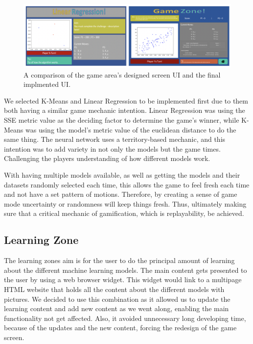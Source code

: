 		\begin{figure}[t]
			\includegraphics[width=15cm]{graphics/game_zone.png}
			\caption{A comparison of the game area's designed screen UI and the final implmented UI.}
			\label{fig:ui_ga}
		\end{figure}
		
		
		We selected K-Means and Linear Regression to be implemented first due to them both having a similar game mechanic intention. Linear Regression was using the SSE metric value as the deciding factor to determine the game's winner, while K-Means was using the model's metric value of the euclidean distance to do the same thing. The neural network uses a territory-based mechanic, and this intention was to add variety in not only the models but the game times. Challenging the players understanding of how different models work.
		
		With having multiple models available, as well as getting the models and their datasets randomly selected each time, this allows the game to feel fresh each time and not have a set pattern of motions. Therefore, by creating a sense of game mode uncertainty or randomness will keep things fresh. Thus, ultimately making sure that a critical mechanic of gamification, which is replayability, be achieved.  
		
	
	\subsection{Learning Zone}
	
	The learning zones aim is for the user to do the principal amount of learning about the different machine learning models. The main content gets presented to the user by using a web browser widget. This widget would link to a multipage HTML website that holds all the content about the different models with pictures. We decided to use this combination as it allowed us to update the learning content and add new content as we went along, enabling the main functionality not get affected. Also, it avoided unnecessary long developing time, because of the updates and the new content, forcing the redesign of the game screen. 
	
